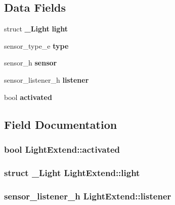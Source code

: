 \subsection*{Data Fields}
\begin{DoxyCompactItemize}
\item 
struct {\bf \-\_\-\-Light} {\bfseries light}\label{structLightExtend_ae869e91c40ae4b6c4eb85ca677374378}

\item 
sensor\-\_\-type\-\_\-e {\bfseries type}\label{structLightExtend_ad3f196c5731075f0adab9baaecb48e4d}

\item 
sensor\-\_\-h {\bfseries sensor}\label{structLightExtend_a77688fb3024588e9665b62b247edaf46}

\item 
sensor\-\_\-listener\-\_\-h {\bfseries listener}\label{structLightExtend_a1fcf4c9b9a605a5cdc43e3401294f3e6}

\item 
bool {\bfseries activated}\label{structLightExtend_a506bf6eff561266824ed7e50a7b2ab4b}

\end{DoxyCompactItemize}


\subsection{Field Documentation}
\subsubsection[{activated}]{\setlength{\rightskip}{0pt plus 5cm}bool Light\-Extend\-::activated}\label{structLightExtend_a506bf6eff561266824ed7e50a7b2ab4b}
\subsubsection[{light}]{\setlength{\rightskip}{0pt plus 5cm}struct {\bf \-\_\-\-Light} Light\-Extend\-::light}\label{structLightExtend_ae869e91c40ae4b6c4eb85ca677374378}
\subsubsection[{listener}]{\setlength{\rightskip}{0pt plus 5cm}sensor\-\_\-listener\-\_\-h Light\-Extend\-::listener}\label{structLightExtend_a1fcf4c9b9a605a5cdc43e3401294f3e6}
